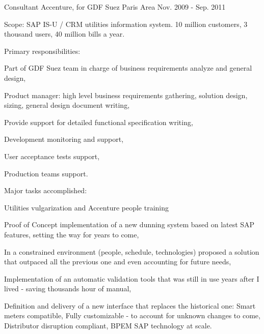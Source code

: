 \begin{cventries}
  \cventry
    {Consultant} %
    {Accenture, for GDF Suez} %
    {Paris Area} %
    {Nov. 2009 - Sep. 2011} %
    {
      \begin{cvitems} %
        \item {Scope: SAP IS-U / CRM utilities information system. 10 million customers, 3 thousand users, 40 million bills a year.}
        \item {Primary responsibilities:}
        \begin{cvsubitems}
          \item {Part of GDF Suez team in charge of business requirements analyze and general design,}
          \item {Product manager: high level business requirements gathering, solution design, sizing, general design document writing,}
          \item {Provide support for detailed functional specification writing,}
          \item {Development monitoring and support,}
          \item {User acceptance tests support,}
          \item {Production teams support.}
        \end{cvsubitems}
        \item {Major tasks accomplished:}
        \begin{cvsubitems}
          \item {Utilities vulgarization and Accenture people training}
          \item {Proof of Concept implementation of a new dunning system based on latest SAP features, setting the way for years to come,}
          \item {In a constrained environment (people, schedule, technologies) proposed a solution that outpaced all the previous one and even accounting for future needs,}
          \item {Implementation of an automatic validation tools that was still in use years after I lived - saving thousands hour of manual,}
          \item {Definition and delivery of a new interface that replaces the historical one: Smart meters compatible, Fully customizable - to account for unknown changes to come, Distributor disruption compliant, BPEM SAP technology at scale.}
        \end{cvsubitems}
      \end{cvitems}
    }


\end{cventries}

